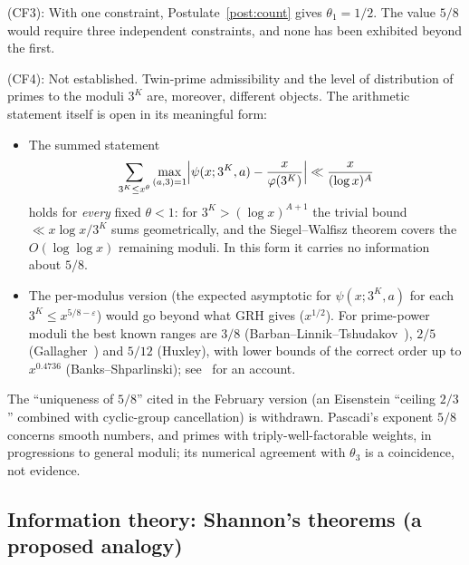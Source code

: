 \documentclass[12pt]{amsart}
\theoremstyle{plain}
\theoremstyle{definition}
\theoremstyle{remark}
\begin{document}
(CF3): With one constraint, Postulate~\ref{post:count} gives $\theta_1 = 1/2$.
The value $5/8$ would require three independent constraints, and none has been
exhibited beyond the first.

(CF4): Not established. Twin-prime admissibility and the level of distribution
of primes to the moduli $3^K$ are, moreover, different objects. The arithmetic
statement itself is open in its meaningful form:
\begin{itemize}
  \item The summed statement
    \[
      \sum_{3^K \leq x^{\theta}} \max_{(a,3) = 1}
      \Bigl| \psi(x;3^K,a) - \frac{x}{\varphi(3^K)} \Bigr|
      \ll \frac{x}{(\log x)^A}
    \]
    holds for \emph{every} fixed $\theta < 1$: for $3^K > (\log x)^{A+1}$ the
    trivial bound $\ll x \log x / 3^K$ sums geometrically, and the
    Siegel--Walfisz theorem covers the $O(\log\log x)$ remaining moduli. In
    this form it carries no information about $5/8$.
  \item The per-modulus version (the expected asymptotic for
    $\psi(x;3^K,a)$ for each $3^K \leq x^{5/8-\varepsilon}$) would go beyond
    what GRH gives ($x^{1/2}$). For prime-power moduli the best known ranges are
    $3/8$ (Barban--Linnik--Tshudakov~\cite{BLT1964}), $2/5$
    (Gallagher~\cite{Gallagher1972}) and $5/12$ (Huxley), with lower bounds of
    the correct order up to $x^{0.4736}$ (Banks--Shparlinski);
    see~\cite{BaierPujahari2022} for an account.
\end{itemize}
The ``uniqueness of $5/8$'' cited in the February version (an Eisenstein
``ceiling $2/3$'' combined with cyclic-group cancellation) is withdrawn.
Pascadi's exponent $5/8$~\cite{Pascadi2025} concerns smooth numbers, and primes
with triply-well-factorable weights, in progressions to general moduli; its
numerical agreement with $\theta_3$ is a coincidence, not evidence.

\subsection{Information theory: Shannon's theorems (a proposed analogy)}
\label{sec:shannon}
\end{document}
